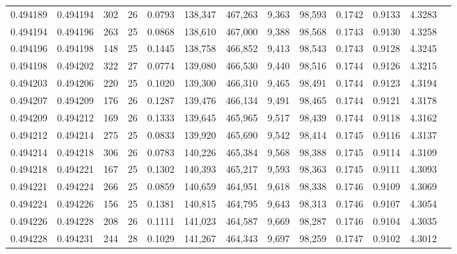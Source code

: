 \begin{tabular}{rrrrrrrrrrrrr}
0.494189 & 0.494194 & 302 &  26 &                                     0.0793 & 138,347 & 467,263 &   9,363 &  98,593 & 0.1742 & 0.9133 & 4.3283 \\
0.494194 & 0.494196 & 263 &  25 &                                     0.0868 & 138,610 & 467,000 &   9,388 &  98,568 & 0.1743 & 0.9130 & 4.3258 \\
0.494196 & 0.494198 & 148 &  25 &                                     0.1445 & 138,758 & 466,852 &   9,413 &  98,543 & 0.1743 & 0.9128 & 4.3245 \\
0.494198 & 0.494202 & 322 &  27 &                                     0.0774 & 139,080 & 466,530 &   9,440 &  98,516 & 0.1744 & 0.9126 & 4.3215 \\
0.494203 & 0.494206 & 220 &  25 &                                     0.1020 & 139,300 & 466,310 &   9,465 &  98,491 & 0.1744 & 0.9123 & 4.3194 \\
0.494207 & 0.494209 & 176 &  26 &                                     0.1287 & 139,476 & 466,134 &   9,491 &  98,465 & 0.1744 & 0.9121 & 4.3178 \\
0.494209 & 0.494212 & 169 &  26 &                                     0.1333 & 139,645 & 465,965 &   9,517 &  98,439 & 0.1744 & 0.9118 & 4.3162 \\
0.494212 & 0.494214 & 275 &  25 &                                     0.0833 & 139,920 & 465,690 &   9,542 &  98,414 & 0.1745 & 0.9116 & 4.3137 \\
0.494214 & 0.494218 & 306 &  26 &                                     0.0783 & 140,226 & 465,384 &   9,568 &  98,388 & 0.1745 & 0.9114 & 4.3109 \\
0.494218 & 0.494221 & 167 &  25 &                                     0.1302 & 140,393 & 465,217 &   9,593 &  98,363 & 0.1745 & 0.9111 & 4.3093 \\
0.494221 & 0.494224 & 266 &  25 &                                     0.0859 & 140,659 & 464,951 &   9,618 &  98,338 & 0.1746 & 0.9109 & 4.3069 \\
0.494224 & 0.494226 & 156 &  25 &                                     0.1381 & 140,815 & 464,795 &   9,643 &  98,313 & 0.1746 & 0.9107 & 4.3054 \\
0.494226 & 0.494228 & 208 &  26 &                                     0.1111 & 141,023 & 464,587 &   9,669 &  98,287 & 0.1746 & 0.9104 & 4.3035 \\
0.494228 & 0.494231 & 244 &  28 &                                     0.1029 & 141,267 & 464,343 &   9,697 &  98,259 & 0.1747 & 0.9102 & 4.3012 \\

\end{tabular}

